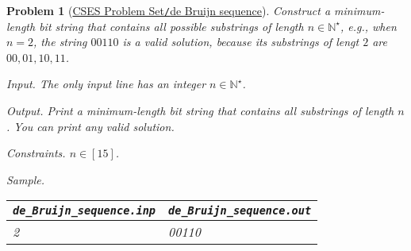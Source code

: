 \documentclass{article}
\newtheorem{problem}{Problem}
\begin{document}
\begin{problem}[\href{https://cses.fi/problemset/task/1692}{CSES Problem Set{\tt/}de Bruijn sequence}]
    Construct a minimum-length bit string that contains all possible substrings of length $n\in\mathbb{N}^\star$, e.g., when $n = 2$, the string $00110$ is a valid solution, because its substrings of lengt $2$ are $00,01,10,11$.
    \item {\sf Input.} The only input line has an integer $n\in\mathbb{N}^\star$.
    \item {\sf Output.} Print a minimum-length bit string that contains all substrings of length $n$. You can print any valid solution.
    \item {\sf Constraints.} $n\in[15]$.
    \item {\sf Sample.}
    \begin{table}[H]
        \centering
        \begin{tabular}{|l|l|}
            \hline
            \verb|de_Bruijn_sequence.inp| & \verb|de_Bruijn_sequence.out| \\
            \hline
            2 & 00110 \\
            \hline
        \end{tabular}
    \end{table}
\end{problem}
\end{document}
